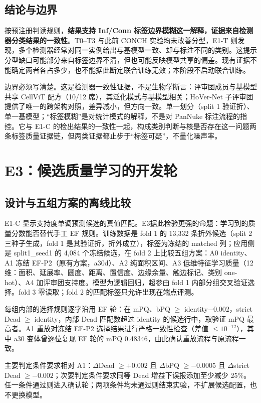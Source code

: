 \documentclass[11pt,a4paper,UTF8,fontset=fandol]{ctexart}
\begin{document}
\subsection{结论与边界}

按预注册判读规则，\textbf{结果支持 Inf/Conn 标签边界模糊这一解释，证据来自检测器分类结果的一致性}。T0--T3 与此前 CONCH 实验均未改善分型，E1-T 则发现，多个检测器经常对同一实例给出与基模型一致、却与标注不同的类别。这提示分型缺口可能部分来自标签边界不清，但也可能反映模型共享的偏差。现有证据不能确定两者各占多少，也不能据此断定联合训练无效；本阶段不启动联合训练。

边界必须写清楚。这是检测器一致性证据，不是生物学断言：评审团成员与基模型共享 CellViT 配方（10/12 席），其泛化模式与基模型相关；HoVer-Net 子评审团提供了唯一的跨架构对照，差异减小，但方向一致。单一划分（split 1 验证折）、单一基模型；“标签模糊”是对统计模式的解释，不是对 PanNuke 标注流程的指控。它与 E1-C 的检出结果的一致性一起，构成类别判断与核是否存在这一问题两条标签质量证据链，但两类证据都止步于“标签可疑”，不量化噪声率。

\section{E3：候选质量学习的开发轮}

\subsection{设计与五组方案的离线比较}

E1-C 显示支持度单调预测候选的真值匹配。E3\cite{specs}据此检验更强的命题：学习到的质量分数能否替代手工 EF 规则。训练数据是 fold 1 的 13,332 条折外候选（split 2 三种子生成，fold 1 是其验证折，折外成立），标签为冻结的 matched 列；应用侧是 split1\_seed1 的 4,084 个冻结候选，在 fold 2 上比较五组方案：A0 identity、A1 冻结 EF-P2（原有方案，a30d）、A2 纯面积区间、A3 低维特征学习质量（12 维：面积、延展率、圆度、距离、置信度、边缘余量、触边标记、类别 one-hot）、A4 加评审团支持度。模型为逻辑回归，超参由 fold 1 内部分组交叉验证选择。fold 3 零读取；fold 2 的匹配标签只允许出现在端点评测。

每组内部的选择规则逐字沿用 EF 轮：在 mPQ、bPQ $\geq$ identity$-0.002$，strict Dead $\geq$ identity，内部 Dead 匹配数超过 identity 的候选行中，取验证 mPQ 最高者。A1 重放对冻结 EF-P2 选择结果进行严格一致性检查（差值 $\leq10^{-12}$），其中 a30 变体曾逐位复现 EF 轮的 mPQ 0.48346，由此确认重放流程与原流程一致。

主要判定条件要求相对 A1：$\Delta$Dead $\geq+0.002$ 且 $\Delta$bPQ $\geq-0.0005$ 且 $\Delta$strict Dead $\geq-0.002$；次要判定条件要求同等 Dead 增益下误报添加至少减少 25\%。任一条件通过则进入确认轮；两项条件均未通过则结束实验，不扩展候选配置，也不更换模型。
\end{document}
